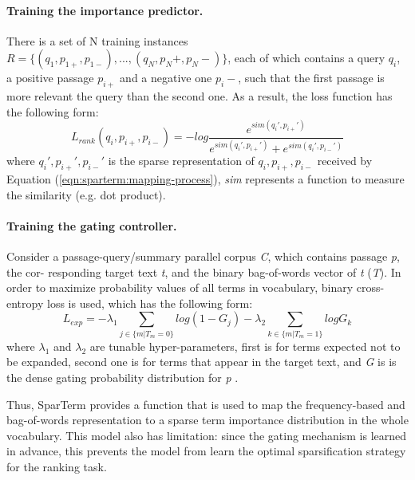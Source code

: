 \documentclass[
    twocolumn,
]{ceurart}
\begin{document}
    \paragraph{Training the importance predictor.}
    There is a set of N training instances $R=\{(q_1, p_{1+}, p_{1-}), ..., (q_N, p_N+, p_N-)\}$,
    each of which contains a query $q_i$, a positive passage $p_{i+}$ and a negative one $p_i-$,
    such that the first passage is more relevant the query than the second one.
    As a result, the loss function has the following form:
    \begin{equation}
        L_{rank}(q_i,p_{i+},p_{i-}) = -log \frac
        {e^{sim(q_i',p_{i+}')}}
        {e^{sim(q_i',p_{i+}')} + e^{sim(q_i',p_{i-}')}}
    \end{equation}
    where $q_i',p_{i+}',p_{i-}'$ is the sparse representation of $q_i,p_{i+},p_{i-}$
    received by Equation (\ref{eqn:sparterm:mapping-process}), \emph{sim} represents a function
    to measure the similarity (e.g. dot product).

    \paragraph{Training the gating controller.}
    Consider a passage-query/summary parallel corpus \emph{C}, which contains passage \emph{p}, the
    cor- responding target text \emph{t}, and the binary bag-of-words vector of \emph{t} (\emph{T}).
    In order to maximize probability values of all terms in vocabulary, binary cross-entropy loss
    is used, which has the following form:
    \begin{equation}
        L_{exp}=-\lambda_1\sum_{j \in \{m|T_m=0\}}log(1-G_j)-\lambda_2\sum_{k \in \{m|T_m=1\}}logG_k
    \end{equation}
    where $\lambda_1$ and $\lambda_2$ are tunable hyper-parameters, first is for terms expected not to be
    expanded, second one is for terms that appear in the target text, and \emph{G} is is the dense
    gating probability distribution for \emph{p} \cite{SparTerm}.\\\par
    Thus, SparTerm provides a function that is used to map the frequency-based and bag-of-words
    representation to a sparse term importance distribution in the whole vocabulary.
    This model also has limitation: since the gating mechanism is learned in advance, this prevents
    the model from learn the optimal sparsification strategy for the ranking task.
\end{document}
